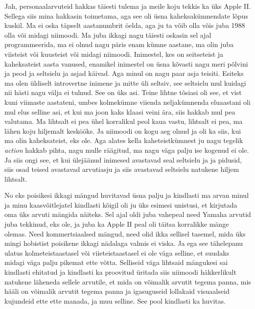 
Jah, personaalarvuteid hakkas täiesti tulema ja meile koju tekkis ka üks Apple 
II. Sellega siis mina hakkasin toimetama, aga see oli 
üsna  kaheksakümnendate lõpus kuskil. Ma ei oska täpselt aastanumbrit öelda, 
aga ju ta võib olla võis juba 1988 olla või midagi niimoodi. Ma juba ikkagi  
nagu täiesti oskasin sel ajal programmeerida, ma ei olnud nagu päris enam kümne 
aastane, ma olin juba viisteist või kuusteist või midagi niimoodi. Inimestel, 
kes on seitseteist ja kaheksateist  aasta vanused, enamikel inimestel on üsna 
kõvasti nagu meri põlvini  ja peod ja seltsielu ja asjad käivad. Aga minul on 
nagu paar asja teisiti. Esiteks ma olen üldiselt introvertne inimene ja mitte 
üli seltsiv, see seltsielu mul kuidagi nii hästi nagu välja ei tulnud. See on 
üks asi. Teine lihtne tõsiasi oli see, et vist kuni viimaste aastateni, umbes 
kolmekümne viienda neljakümnenda eluaastani oli mul elus selline asi, et kui ma 
joon kaks klaasi veini ära, siis hakkab mul pea valutama. Ma lihtsalt ei pea 
ühel  korralikul peol kaua vastu, lihtsalt ei pea,   ma lähen koju hiljemalt 
keskööks. Ja niimoodi on  kogu aeg olnud ja oli ka siis, kui ma olin 
kaheksateist, eks ole. Aga alates kella kaheteistkümnest ju nagu tegelik 
\emph{action} hakkab pihta, nagu mulle räägitud, ma nagu väga palju ise kogenud 
ei ole. Ja siis ongi see, et kui  ülejäänud inimesed avastavad seal seltsielu 
ja ja pidusid, siis osad teised avastavad arvutiasju ja siis avastavad 
seltsielu natukene hiljem lihtsalt.


No eks poisikesi ikkagi mängud huvitavad üsna palju ja kindlasti ma arvan  
minul ja minu kaasvõitlejatel kindlasti kõigil oli ju üks esimesi unistusi, et 
kirjutada oma üks arvuti mängida näiteks. Sel ajal oldi juba vahepeal need 
Yamaha arvutid juba tekkinud, eks ole, ja juba ka Apple II peal oli täitsa 
korralikke  mänge olemas. Need kommertsiaalsed mängud, need olid ikka sellisel 
tasemel, mida üks mingi hobistist poisikene ikkagi nädalaga valmis ei viska. Ja 
ega see tähelepanu ulatus  kolmeteistaastasel või viieteistaastasel ei ole väga 
selline, et suudaks midagi väga palju pikemat ette võtta. Selliseid väga 
lihtsaid mängukesi sai kindlasti ehitatud ja kindlasti ka proovitud üritada 
siis niimoodi häkkerlikult natukene läheneda sellele arvutile, et mida on 
võimalik arvutit tegema panna, mis hääli on võimalik arvutit tegema panna ja  
igasuguseid lollakaid visuaalseid kujundeid ette ette manada, ja muu selline. 
See pool kindlasti ka huvitas. 

